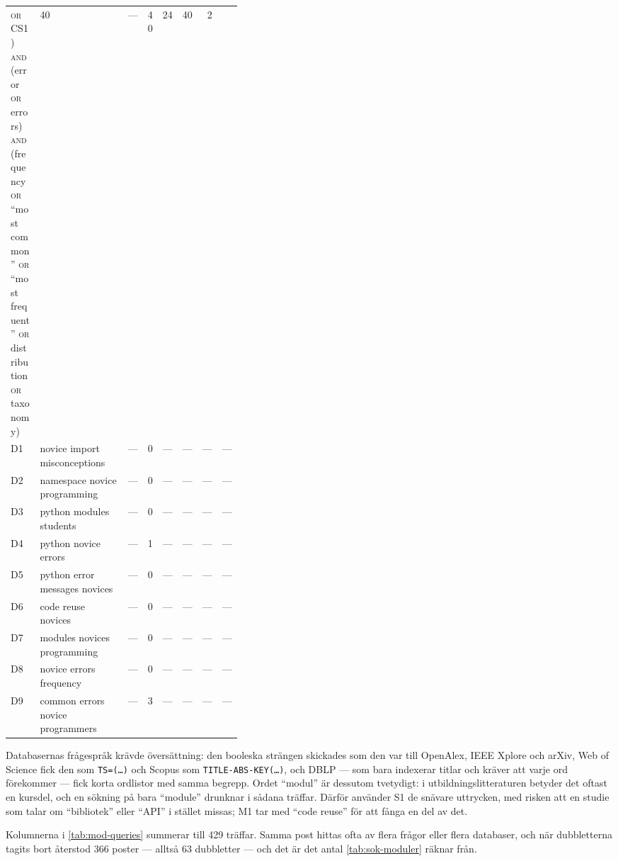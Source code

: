 \begin{table}[!htb]
\begin{sidecaption}
\begin{tabular}{@{}lp{0.38\linewidth}rrrrrr@{}}
        \textsc{or} CS1) \textsc{and} (error \textsc{or} errors)
        \textsc{and} (frequency \textsc{or} \enquote{most common}
        \textsc{or} \enquote{most frequent} \textsc{or} distribution
        \textsc{or} taxonomy)
        & 40 & --- & 40 & 24 & 40 & 2 \\
      D1 & novice import misconceptions & --- & 0 & --- & --- & --- & --- \\
      D2 & namespace novice programming & --- & 0 & --- & --- & --- & --- \\
      D3 & python modules students & --- & 0 & --- & --- & --- & --- \\
      D4 & python novice errors & --- & 1 & --- & --- & --- & --- \\
      D5 & python error messages novices & --- & 0 & --- & --- & --- & --- \\
      D6 & code reuse novices & --- & 0 & --- & --- & --- & --- \\
      D7 & modules novices programming & --- & 0 & --- & --- & --- & --- \\
      D8 & novice errors frequency & --- & 0 & --- & --- & --- & --- \\
      D9 & common errors novice programmers & --- & 3 & --- & --- & --- & --- \\
      \bottomrule
    \end{tabular}
  \end{sidecaption}
\end{table}

Databasernas frågespråk krävde översättning: den booleska strängen
skickades som den var till OpenAlex, IEEE Xplore och arXiv, Web of
Science fick den som \texttt{TS=(\dots)} och Scopus som
\texttt{TITLE-ABS-KEY(\dots)}, och DBLP --- som bara indexerar titlar och
kräver att varje ord förekommer --- fick korta ordlistor med samma
begrepp.  Ordet \enquote{modul} är dessutom tvetydigt: i
utbildningslitteraturen betyder det oftast en kursdel, och en sökning på
bara \enquote{module} drunknar i sådana träffar.  Därför använder S1 de
snävare uttrycken, med risken att en studie som talar om
\enquote{bibliotek} eller \enquote{API} i stället missas; M1 tar med
\enquote{code reuse} för att fånga en del av det.

Kolumnerna i \cref{tab:mod-queries} summerar till 429 träffar.  Samma
post hittas ofta av flera frågor eller flera databaser, och när
dubbletterna tagits bort återstod 366 poster --- alltså 63 dubbletter ---
och det är det antal \cref{tab:sok-moduler} räknar från.

